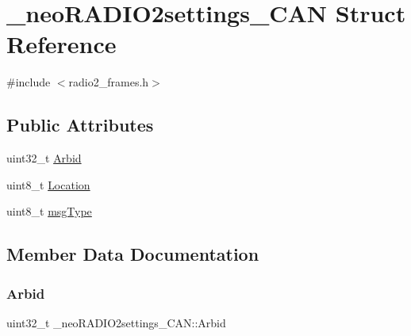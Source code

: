 \hypertarget{struct__neo_r_a_d_i_o2settings___c_a_n}{}\section{\+\_\+neo\+R\+A\+D\+I\+O2settings\+\_\+\+C\+AN Struct Reference}
\label{struct__neo_r_a_d_i_o2settings___c_a_n}


{\ttfamily \#include $<$radio2\+\_\+frames.\+h$>$}

\subsection*{Public Attributes}
\begin{DoxyCompactItemize}
\item 
uint32\+\_\+t \mbox{\hyperlink{struct__neo_r_a_d_i_o2settings___c_a_n_a1eccbeef18587085d17cdb29fcc5bbf4}{Arbid}}
\item 
uint8\+\_\+t \mbox{\hyperlink{struct__neo_r_a_d_i_o2settings___c_a_n_a45152f4d92a063d3c7547090bcc6ae23}{Location}}
\item 
uint8\+\_\+t \mbox{\hyperlink{struct__neo_r_a_d_i_o2settings___c_a_n_a3e9d35335d2bd0cf6743131a062f6849}{msg\+Type}}
\end{DoxyCompactItemize}


\subsection{Member Data Documentation}
\mbox{\label{struct__neo_r_a_d_i_o2settings___c_a_n_a1eccbeef18587085d17cdb29fcc5bbf4}} 
\subsubsection{\texorpdfstring{Arbid}{Arbid}}
{\footnotesize\ttfamily uint32\+\_\+t \+\_\+neo\+R\+A\+D\+I\+O2settings\+\_\+\+C\+A\+N\+::\+Arbid}

\mbox{\label{struct__neo_r_a_d_i_o2settings___c_a_n_a45152f4d92a063d3c7547090bcc6ae23}} 
